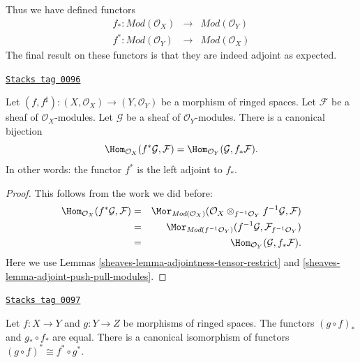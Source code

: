 Thus we have defined functors
\begin{eqnarray*}
f_* : \textit{Mod}(\mathcal{O}_X)
& \longrightarrow &
\textit{Mod}(\mathcal{O}_Y) \\
f^* : \textit{Mod}(\mathcal{O}_Y)
& \longrightarrow &
\textit{Mod}(\mathcal{O}_X)
\end{eqnarray*}
The final result on these functors is that they are indeed
adjoint as expected.

\begin{lemma}
\label{sheaves-lemma-adjoint-pullback-pushforward-modules}
\href{https://stacks.math.columbia.edu/tag/0096}{\texttt{Stacks tag 0096}}

Let $(f, f^\sharp) : (X, \mathcal{O}_X) \to (Y, \mathcal{O}_Y)$
be a morphism of ringed spaces.
Let $\mathcal{F}$ be a sheaf of $\mathcal{O}_X$-modules.
Let $\mathcal{G}$ be a sheaf of $\mathcal{O}_Y$-modules.
There is a canonical bijection
$$
\Hom_{\mathcal{O}_X}(f^*\mathcal{G}, \mathcal{F})
=
\Hom_{\mathcal{O}_Y}(\mathcal{G}, f_*\mathcal{F}).
$$
In other words: the functor $f^*$ is the left adjoint to
$f_*$.
\end{lemma}

\begin{proof}

This follows from the work we did before:
\begin{eqnarray*}
\Hom_{\mathcal{O}_X}(f^*\mathcal{G}, \mathcal{F})
& = &
\Mor_{\textit{Mod}(\mathcal{O}_X)}(
\mathcal{O}_X \otimes_{f^{-1}\mathcal{O}_Y} f^{-1}\mathcal{G}, \mathcal{F}) \\
& = &
\Mor_{\textit{Mod}(f^{-1}\mathcal{O}_Y)}(
f^{-1}\mathcal{G}, \mathcal{F}_{f^{-1}\mathcal{O}_Y}) \\
& = &
\Hom_{\mathcal{O}_Y}(\mathcal{G}, f_*\mathcal{F}).
\end{eqnarray*}
Here we use Lemmas \ref{sheaves-lemma-adjointness-tensor-restrict}
and \ref{sheaves-lemma-adjoint-push-pull-modules}.
\end{proof}

\begin{lemma}
\label{sheaves-lemma-push-pull-composition-modules}
\href{https://stacks.math.columbia.edu/tag/0097}{\texttt{Stacks tag 0097}}

Let $f : X \to Y$ and $g : Y \to Z$ be morphisms of ringed spaces.
The functors $(g \circ f)_*$ and $g_* \circ f_*$ are equal.
There is a canonical isomorphism of functors
$(g \circ f)^* \cong f^* \circ g^*$.
\end{lemma}

